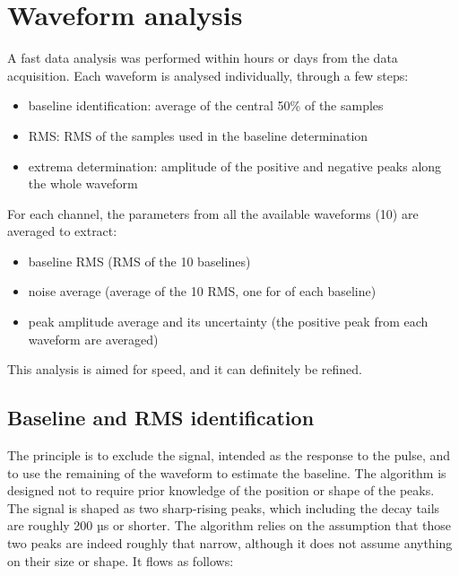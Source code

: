 \section{Waveform analysis}
\label{sec:Analysis}


A fast data analysis was performed within hours or days from the data
acquisition. Each waveform is analysed individually, through a few
steps:

\begin{itemize}
\tightlist
\item
  baseline identification: average of the central 50\% of the samples
\item
  RMS: RMS of the samples used in the baseline determination
\item
  extrema determination: amplitude of the positive and negative peaks
  along the whole waveform
\end{itemize}


For each channel, the parameters from all the available waveforms (10)
are averaged to extract:

\begin{itemize}
\tightlist
\item
  baseline RMS (RMS of the 10 baselines)
\item
  noise average (average of the 10 RMS, one for of each baseline)
\item
  peak amplitude average and its uncertainty (the positive
  peak from each waveform are averaged)
\end{itemize}

This analysis is aimed for speed, and it can definitely be refined.

\subsection{Baseline and RMS identification}
\label{sec:baseline-and-rms-identification}


The principle is to exclude the signal, intended as the response to the
pulse, and to use the remaining of the waveform to estimate the
baseline. The algorithm is designed not to require prior knowledge of
the position or shape of the peaks.\\

The signal is shaped as two sharp-rising peaks, which including the
decay tails are roughly 200 µs or shorter. The algorithm relies on the
assumption that those two peaks are indeed roughly that narrow, although
it does not assume anything on their size or shape. It flows as follows:

